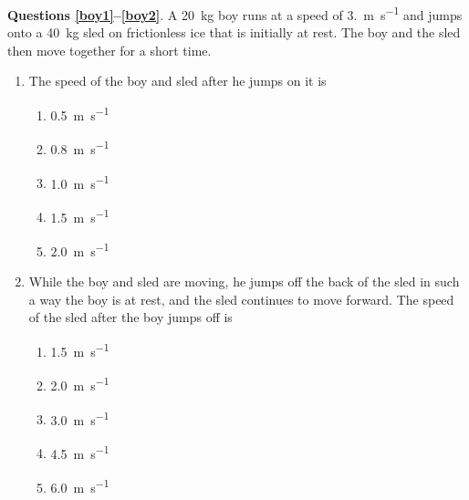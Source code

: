 \documentclass{../../../oss-classkick}
\begin{document}
\begin{multicols}{2}
  \textbf{Questions \ref{boy1}--\ref{boy2}}. A \SI{20}{\kilo\gram} boy runs at
  a speed of \SI{3.}{\metre\per\second} and jumps onto a \SI{40}{\kilo\gram}
  sled on frictionless ice that is initially at rest. The boy and the sled then
  move together for a short time.
  \begin{enumerate}[resume,leftmargin=18pt]
  \item The speed of the boy and sled after he jumps on it is
    \label{boy1}
    \begin{enumerate}[nosep,leftmargin=18pt,label=(\Alph*)]
    \item\SI{0.5}{\metre\per\second}
    \item\SI{0.8}{\metre\per\second}
    \item\SI{1.0}{\metre\per\second}
    \item\SI{1.5}{\metre\per\second}
    \item\SI{2.0}{\metre\per\second}
    \end{enumerate}
    
  \item While the boy and sled are moving, he jumps off the back of the sled in
    such a way the boy is at rest, and the sled continues to move forward.
    The speed of the sled after the boy jumps off is
    \label{boy2}
    \begin{enumerate}[nosep,leftmargin=18pt,label=(\Alph*)]
    \item\SI{1.5}{\metre\per\second}
    \item\SI{2.0}{\metre\per\second}
    \item\SI{3.0}{\metre\per\second}
    \item\SI{4.5}{\metre\per\second}
    \item\SI{6.0}{\metre\per\second}
    \end{enumerate}


\end{enumerate}
\end{multicols}
\end{document}
